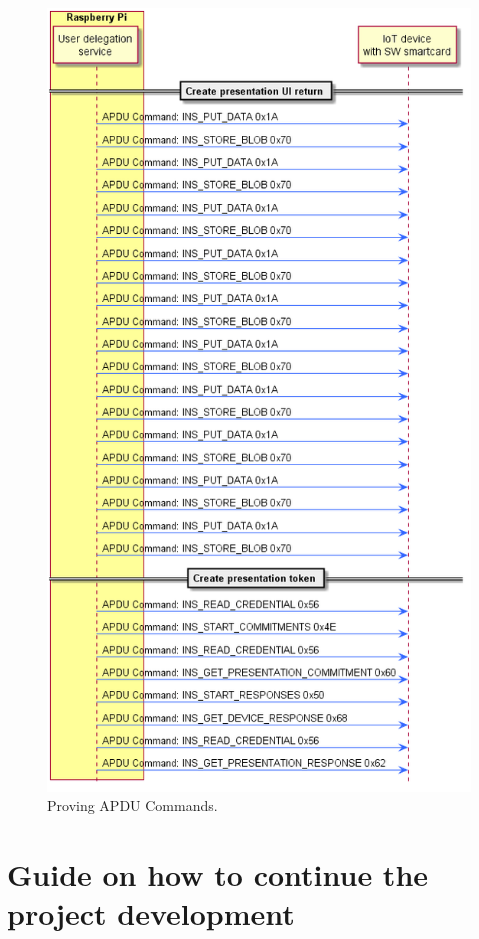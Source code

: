 \begin{figure}[bth]
	\begin{center}
		\includegraphics[width=\linewidth]{gfx/UML/APDUsProving}
	\end{center}
	\caption{Proving APDU Commands.}
	\label{fig:APDUsProving}
\end{figure}

\chapter{Guide on how to continue the project development}